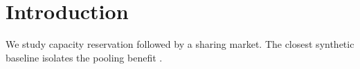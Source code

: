 \section{Introduction}
We study capacity reservation followed by a sharing market. The closest
synthetic baseline isolates the pooling benefit \citep{synthetic-pooling}.
